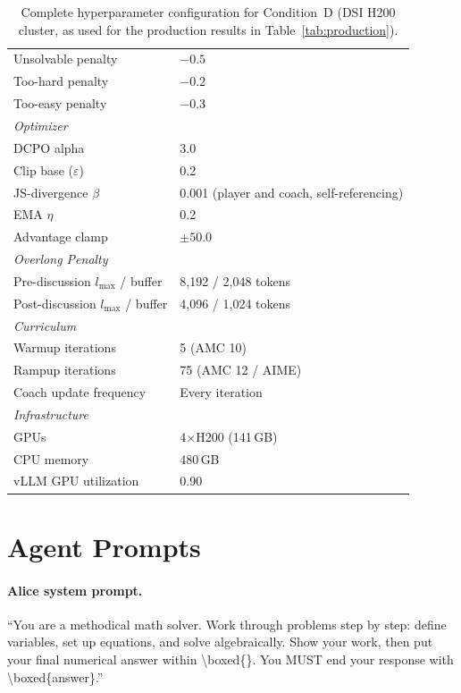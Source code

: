 \documentclass{article}
\begin{document}
\begin{table}[h]
\begin{tabular}{ll}
Unsolvable penalty & $-0.5$ \\
Too-hard penalty & $-0.2$ \\
Too-easy penalty & $-0.3$ \\
\midrule
\multicolumn{2}{l}{\emph{Optimizer}} \\
DCPO alpha & 3.0 \\
Clip base ($\varepsilon$) & 0.2 \\
JS-divergence $\beta$ & 0.001 (player and coach, self-referencing) \\
EMA $\eta$ & 0.2 \\
Advantage clamp & $\pm 50.0$ \\
\midrule
\multicolumn{2}{l}{\emph{Overlong Penalty}} \\
Pre-discussion $l_{\max}$ / buffer & 8,192 / 2,048 tokens \\
Post-discussion $l_{\max}$ / buffer & 4,096 / 1,024 tokens \\
\midrule
\multicolumn{2}{l}{\emph{Curriculum}} \\
Warmup iterations & 5 (AMC 10) \\
Rampup iterations & 75 (AMC 12 / AIME) \\
Coach update frequency & Every iteration \\
\midrule
\multicolumn{2}{l}{\emph{Infrastructure}} \\
GPUs & 4$\times$H200 (141\,GB) \\
CPU memory & 480\,GB \\
vLLM GPU utilization & 0.90 \\
\bottomrule
\end{tabular}
\caption{Complete hyperparameter configuration for Condition~D (DSI H200 cluster, as used for the production results in Table~\ref{tab:production}).}
\label{tab:hyperparams}
\end{table}


\section{Agent Prompts}
\label{sec:prompts}

\paragraph{Alice system prompt.} ``You are a methodical math solver. Work through problems step by step: define variables, set up equations, and solve algebraically. Show your work, then put your final numerical answer within \textbackslash boxed\{\}. You MUST end your response with \textbackslash boxed\{answer\}.''
\end{document}

